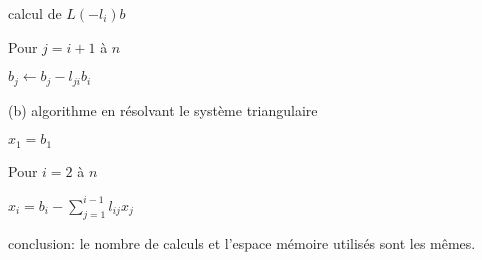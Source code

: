 {\begin{enumerate}
{\hspace{2cm} calcul de $L(-l_i)b$

\hspace{3cm} Pour $j=i+1$ \`a $n$

\hspace{4cm} $b_j\leftarrow b_j-l_{ji}b_i$


(b) algorithme en r\'esolvant le syst\`eme triangulaire

$x_1 =b_1$

Pour $i=2$ \`a $n$ 

\hspace{2cm}$x_i=b_i-\sum_{j=1}^{i-1}l_{ij}x_j$


conclusion: le nombre de calculs et l'espace m\'emoire utilis\'es sont les m\^emes.
}
\end{enumerate}
}
